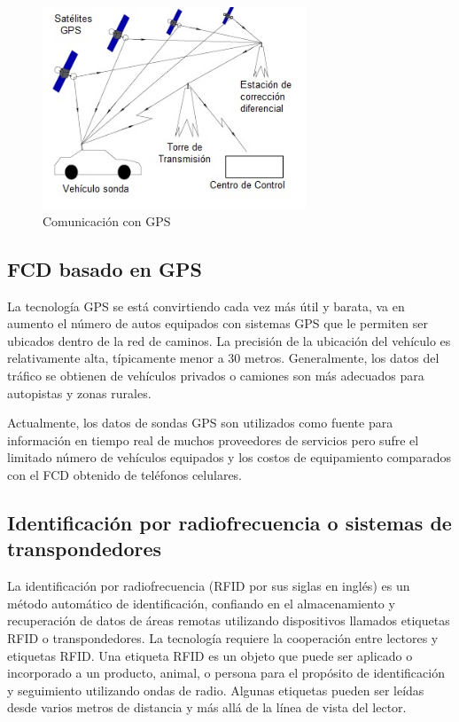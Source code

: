 \begin{figure}[h]
	\centering
	\includegraphics[width=0.7\textwidth]{capitulos/3/figuras/figura4.jpg}
	\caption{\label{fig:ComunicacionGPS}  Comunicación con GPS}	
\end{figure}

\subsection{FCD basado en GPS}

La tecnología GPS se está convirtiendo cada vez más útil y barata, va en aumento el número de autos equipados con sistemas GPS que le permiten ser ubicados dentro de la red de caminos. La precisión de la ubicación del vehículo es relativamente alta, típicamente menor a 30 metros. Generalmente, los datos del tráfico se obtienen de vehículos privados o camiones son más adecuados para autopistas y zonas rurales.

Actualmente, los datos de sondas GPS son utilizados como fuente para información en tiempo real de muchos proveedores de servicios pero sufre el limitado número de vehículos equipados y los costos de equipamiento comparados con el FCD obtenido de teléfonos celulares.

\subsection{Identificación por radiofrecuencia o sistemas de transpondedores}

La identificación por radiofrecuencia (RFID por sus siglas en inglés)  es un método automático de identificación, confiando en el almacenamiento y recuperación de datos de áreas remotas utilizando dispositivos llamados etiquetas RFID o transpondedores. La tecnología requiere la cooperación entre lectores y etiquetas RFID. Una etiqueta RFID es un objeto que puede ser aplicado o incorporado a un producto, animal, o persona para el propósito de identificación y seguimiento utilizando ondas de radio. Algunas etiquetas pueden ser leídas desde varios metros de distancia y más allá de la línea de vista del lector.

